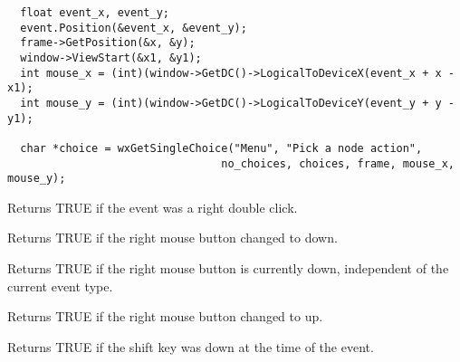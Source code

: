 \begin{verbatim}
  float event_x, event_y;
  event.Position(&event_x, &event_y);
  frame->GetPosition(&x, &y);
  window->ViewStart(&x1, &y1);
  int mouse_x = (int)(window->GetDC()->LogicalToDeviceX(event_x + x - x1);
  int mouse_y = (int)(window->GetDC()->LogicalToDeviceY(event_y + y - y1);

  char *choice = wxGetSingleChoice("Menu", "Pick a node action",
                                 no_choices, choices, frame, mouse_x, mouse_y);
\end{verbatim}



Returns TRUE if the event was a right double click.



Returns TRUE if the right mouse button changed to down.



Returns TRUE if the right mouse button is currently down, independent
of the current event type.



Returns TRUE if the right mouse button changed to up.



Returns TRUE if the shift key was down at the time of the event.

